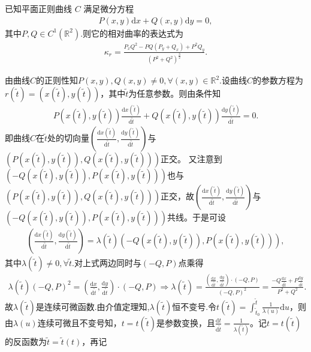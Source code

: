 \documentclass[../../main.tex]{subfiles}%
\begin{document}
\begin{proposition}\label{proposition:满足微分方程的曲线的相对曲率}
已知平面正则曲线 $C$ 满足微分方程
\begin{align*}
P(x,y)\mathrm{d}x+Q(x,y)\mathrm{d}y=0,
\end{align*}
其中$P,Q\in C^1(\mathbb{R}^2)$.则它的相对曲率的表达式为
\begin{align*}
\kappa_r=\frac{P_xQ^2-PQ(P_y+Q_x)+P^2Q_y}{(P^2+Q^2)^{\frac{3}{2}}}.
\end{align*}
\end{proposition}
\begin{solution}
由曲线$C$的正则性知$P(x,y),Q(x,y)\neq0,\forall(x,y)\in\mathbb{R}^2.$设曲线$C$的参数方程为$r(\tilde{t})=(x(\tilde{t}),y(\tilde{t}))$，其中$\tilde{t}$为任意参数。则由条件知
\begin{align*}
P(x(\tilde{t}),y(\tilde{t}))\frac{\mathrm{d}x(\tilde{t})}{\mathrm{d}\tilde{t}}+Q(x(\tilde{t}),y(\tilde{t}))\frac{\mathrm{d}y(\tilde{t})}{\mathrm{d}\tilde{t}}=0.
\end{align*}
即曲线$C$在$\tilde{t}$处的切向量$(\frac{\mathrm{d}x(\tilde{t})}{\mathrm{d}\tilde{t}},\frac{\mathrm{d}y(\tilde{t})}{\mathrm{d}\tilde{t}})$与$(P(x(\tilde{t}),y(\tilde{t})),Q(x(\tilde{t}),y(\tilde{t})))$正交。
又注意到$(-Q(x(\tilde{t}),y(\tilde{t})),P(x(\tilde{t}),y(\tilde{t})))$也与$(P(x(\tilde{t}),y(\tilde{t})),Q(x(\tilde{t}),y(\tilde{t})))$正交，故$(\frac{\mathrm{d}x(\tilde{t})}{\mathrm{d}\tilde{t}},\frac{\mathrm{d}y(\tilde{t})}{\mathrm{d}\tilde{t}})$与$(-Q(x(\tilde{t}),y(\tilde{t})),P(x(\tilde{t}),y(\tilde{t})))$共线。于是可设
\begin{align*}
\left(\frac{\mathrm{d}x(\tilde{t})}{\mathrm{d}\tilde{t}},\frac{\mathrm{d}y(\tilde{t})}{\mathrm{d}\tilde{t}}\right)=\lambda(\tilde{t})\left(-Q(x(\tilde{t}),y(\tilde{t})),P(x(\tilde{t}),y(\tilde{t}))\right),
\end{align*}
其中$\lambda(\tilde{t})\neq 0,\forall \tilde{t}$.对上式两边同时与$(-Q,P)$点乘得
\begin{align*}
\lambda \left( \tilde{t} \right) \left( -Q,P \right) ^2=\left( \frac{\mathrm{d}x}{\mathrm{d}\tilde{t}},\frac{\mathrm{d}y}{\mathrm{d}\tilde{t}} \right) \cdot \left( -Q,P \right) \Longrightarrow \lambda \left( \tilde{t} \right) =\frac{\left( \frac{\mathrm{d}x}{\mathrm{d}\tilde{t}},\frac{\mathrm{d}y}{\mathrm{d}\tilde{t}} \right) \cdot \left( -Q,P \right)}{\left( -Q,P \right) ^2}=\frac{-Q\frac{\mathrm{d}x}{\mathrm{d}\tilde{t}}+P\frac{\mathrm{d}y}{\mathrm{d}\tilde{t}}}{P^2+Q^2}.
\end{align*}
故$\lambda(\tilde{t})$是连续可微函数.由介值定理知,$\lambda(\tilde{t})$恒不变号.令$t(\tilde{t})=\int_{\tilde{t}_0}^{\tilde{t}}\frac{1}{\lambda(u)}\mathrm{d}u$，则由$\lambda(u)$连续可微且不变号知，$t=t(\tilde{t})$是参数变换，且$\frac{\mathrm{d}t}{\mathrm{d}\tilde{t}}=\frac{1}{\lambda(\tilde{t})}$。记$t=t(\tilde{t})$的反函数为$\tilde{t}=\tilde{t}(t)$，再记

\end{solution}
\end{document}
